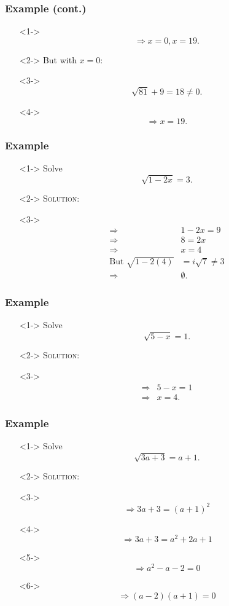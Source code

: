 \documentclass[handout]{beamer}
\begin{document}
\begin{frame}
	\frametitle{Example (cont.)} 
	\begin{enumerate}
		\item[]<1-> \[ \Rightarrow x=0, x=19. \] 
		\item[]<2-> But with $x=0$: 
		\item[]<3-> 
		\[
			\sqrt{81}+9=18 \neq 0. 
		\]
		\item[]<4-> 
		\[
			\Rightarrow x=19.  
		\]
	\end{enumerate}
\end{frame}

\begin{frame}
	\frametitle{Example} 
	\begin{enumerate}
		\item[]<1-> Solve 
		\[
			\sqrt{1-2x}=3. 
		\]
		\item[]<2-> \textsc{Solution:} 
		\item[]<3-> 
			\begin{align*}
				\Rightarrow & 1-2x=9 \\
				\Rightarrow & 8=2x \\
				\Rightarrow & x=4 \\
				\text{But } \sqrt{1-2(4)}&=i\sqrt{7} \neq 3 \\
				\Rightarrow & \emptyset. 
			\end{align*} 
	\end{enumerate}
\end{frame}

\begin{frame}
	\frametitle{Example} 
	\begin{enumerate}
		\item[]<1-> Solve 
		\[
			\sqrt{5-x}=1. 
		\]
		\item[]<2-> \textsc{Solution:} 
		\item[]<3-> 
			\begin{align*}
				\Rightarrow & 5-x=1 \\
				\Rightarrow & x=4. 
			\end{align*} 
	\end{enumerate}
\end{frame}

\begin{frame}
	\frametitle{Example}
	\begin{enumerate} 
		\item[]<1-> Solve 
		\[
			\sqrt{3a+3}=a+1. 
		\]
		\item[]<2-> \textsc{Solution:} 
		\item[]<3-> \[ \Rightarrow 3a+3=(a+1)^{2} \] 
		\item[]<4-> \[ \Rightarrow 3a+3=a^{2}+2a+1 \] 
		\item[]<5-> \[ \Rightarrow a^{2}-a-2=0 \]
		\item[]<6-> \[ \Rightarrow (a-2)(a+1)=0 \] 
	\end{enumerate}
\end{frame}
\end{document}
